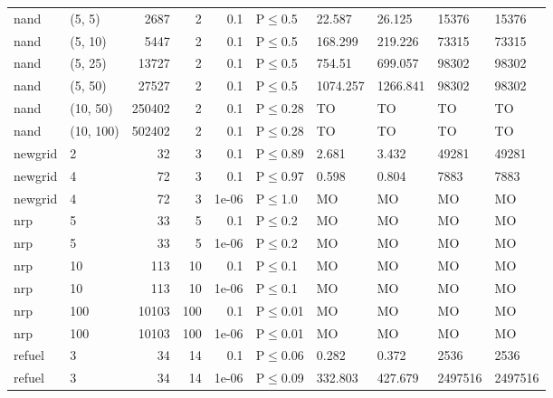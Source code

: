 \begin{longtable}{llrrrlllll}
 nand          & (5, 5)    &   	2687 &   2 & 0.1   & P$\leq$0.5   & 22.587   & 26.125   & 15376   & 15376   \\
 nand          & (5, 10)   &   	5447 &   2 & 0.1   & P$\leq$0.5   & 168.299  & 219.226  & 73315   & 73315   \\
 nand          & (5, 25)   &  	13727 &   2 & 0.1   & P$\leq$0.5   & 754.51   & 699.057  & 98302   & 98302   \\
 nand          & (5, 50)   &  	27527 &   2 & 0.1   & P$\leq$0.5   & 1074.257 & 1266.841 & 98302   & 98302   \\
 nand          & (10, 50)  & 	250402 &   2 & 0.1   & P$\leq$0.28  & TO       & TO       & TO      & TO      \\
 nand          & (10, 100) & 	502402 &   2 & 0.1   & P$\leq$0.28  & TO       & TO       & TO      & TO      \\
 newgrid       & 2         &     	32 &   3 & 0.1   & P$\leq$0.89  & 2.681    & 3.432    & 49281   & 49281   \\
 newgrid       & 4         &     	72 &   3 & 0.1   & P$\leq$0.97  & 0.598    & 0.804    & 7883    & 7883    \\
 newgrid       & 4         &     	72 &   3 & 1e-06 & P$\leq$1.0   & MO       & MO       & MO      & MO      \\
 nrp           & 5         &     	33 &   5 & 0.1   & P$\leq$0.2   & MO       & MO       & MO      & MO      \\
 nrp           & 5         &     	33 &   5 & 1e-06 & P$\leq$0.2   & MO       & MO       & MO      & MO      \\
 nrp           & 10        &    	113 &  10 & 0.1   & P$\leq$0.1   & MO       & MO       & MO      & MO      \\
 nrp           & 10        &    	113 &  10 & 1e-06 & P$\leq$0.1   & MO       & MO       & MO      & MO      \\
 nrp           & 100       &  	10103 & 100 & 0.1   & P$\leq$0.01  & MO       & MO       & MO      & MO      \\
 nrp           & 100       &  	10103 & 100 & 1e-06 & P$\leq$0.01  & MO       & MO       & MO      & MO      \\
 refuel        & 3         &     	34 &  14 & 0.1   & P$\leq$0.06  & 0.282    & 0.372    & 2536    & 2536    \\
 refuel        & 3         &     	34 &  14 & 1e-06 & P$\leq$0.09  & 332.803  & 427.679  & 2497516 & 2497516 \\
\bottomrule
\end{longtable}
